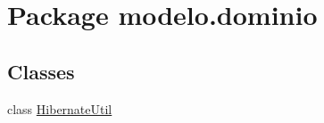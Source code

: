 \hypertarget{namespacemodelo_1_1dominio}{}\section{Package modelo.\+dominio}
\label{namespacemodelo_1_1dominio}
\subsection*{Classes}
\begin{DoxyCompactItemize}
\item 
class \mbox{\hyperlink{classmodelo_1_1dominio_1_1HibernateUtil}{Hibernate\+Util}}
\end{DoxyCompactItemize}
